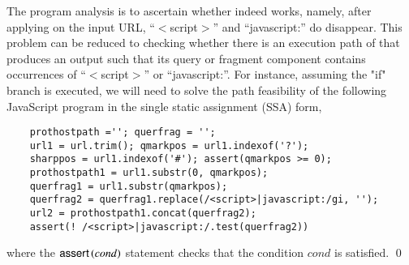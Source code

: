 \begin{example}
The program analysis is to ascertain whether {\urlxsssanitise} indeed works, namely, after applying {\urlxsssanitise} on the input URL, ``$<$script$>$'' and ``javascript:'' do disappear.  This problem can be reduced to checking whether there is an execution path of {\urlxsssanitise} that produces an output such that its query or fragment component contains occurrences of ``$<$script$>$'' or ``javascript:''. For instance, assuming  the "if" branch is executed, %
we will need to solve the path feasibility of the following JavaScript program in the single static assignment (SSA) form,

{\small
\begin{verbatim}
    prothostpath =''; querfrag = '';
    url1 = url.trim(); qmarkpos = url1.indexof('?');
    sharppos = url1.indexof('#'); assert(qmarkpos >= 0); 
    prothostpath1 = url1.substr(0, qmarkpos);
    querfrag1 = url1.substr(qmarkpos);
    querfrag2 = querfrag1.replace(/<script>|javascript:/gi, '');
    url2 = prothostpath1.concat(querfrag2);
    assert(! /<script>|javascript:/.test(querfrag2))
\end{verbatim}
}
where the $\textsf{assert}\left(cond\right)$ statement checks that the condition $cond$ is satisfied. \qed
\end{example}